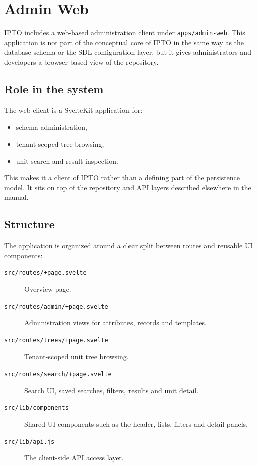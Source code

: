 \section{Admin Web}
\label{sec:AdminWeb}

IPTO includes a web-based administration client under \texttt{apps/admin-web}. This application is not part of the conceptual core of IPTO in the same way as the database schema or the SDL configuration layer, but it gives administrators and developers a browser-based view of the repository.

\subsection{Role in the system}

The web client is a SvelteKit application for:
\begin{itemize}
\item schema administration,
\item tenant-scoped tree browsing,
\item unit search and result inspection.
\end{itemize}

This makes it a client of IPTO rather than a defining part of the persistence model. It sits on top of the repository and API layers described elsewhere in the manual.

\subsection{Structure}

The application is organized around a clear split between routes and reusable UI components:
\begin{description}
\item[\texttt{src/routes/+page.svelte}] Overview page.
\vspace{.2cm}
\item[\texttt{src/routes/admin/+page.svelte}] Administration views for attributes, records and templates.
\vspace{.2cm}
\item[\texttt{src/routes/trees/+page.svelte}] Tenant-scoped unit tree browsing.
\vspace{.2cm}
\item[\texttt{src/routes/search/+page.svelte}] Search UI, saved searches, filters, results and unit detail.
\vspace{.2cm}
\item[\texttt{src/lib/components}] Shared UI components such as the header, lists, filters and detail panels.
\vspace{.2cm}
\item[\texttt{src/lib/api.js}] The client-side API access layer.
\end{description}

